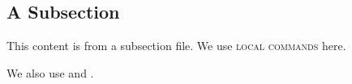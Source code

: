 \newcommand{\subsectioncommand}[1]{{\small\textsc{#1}}}

\subsection{A Subsection}

This content is from a subsection file. We use \subsectioncommand{local commands} here.

We also use  and .

